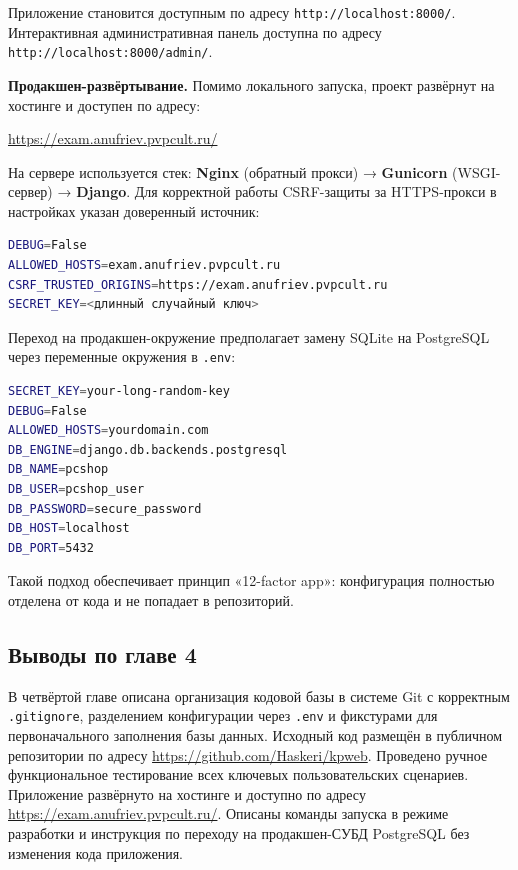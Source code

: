 \documentclass[14pt, a4paper]{extarticle}
\begin{document}
Приложение становится доступным по адресу \texttt{http://localhost:8000/}. Интерактивная административная панель доступна по адресу \texttt{http://localhost:8000/admin/}.

\textbf{Продакшен-развёртывание.} Помимо локального запуска, проект развёрнут на хостинге и доступен по адресу:

\begin{center}
\url{https://exam.anufriev.pvpcult.ru/}
\end{center}

На сервере используется стек: \textbf{Nginx} (обратный прокси) → \textbf{Gunicorn} (WSGI-сервер) → \textbf{Django}. Для корректной работы CSRF-защиты за HTTPS-прокси в настройках указан доверенный источник:

\begin{lstlisting}[language=bash, caption={Ключевые параметры .env на сервере}]
DEBUG=False
ALLOWED_HOSTS=exam.anufriev.pvpcult.ru
CSRF_TRUSTED_ORIGINS=https://exam.anufriev.pvpcult.ru
SECRET_KEY=<длинный случайный ключ>
\end{lstlisting}

Переход на продакшен-окружение предполагает замену SQLite на PostgreSQL через переменные окружения в \texttt{.env}:

\begin{lstlisting}[language=bash, caption={Пример файла .env для PostgreSQL}]
SECRET_KEY=your-long-random-key
DEBUG=False
ALLOWED_HOSTS=yourdomain.com
DB_ENGINE=django.db.backends.postgresql
DB_NAME=pcshop
DB_USER=pcshop_user
DB_PASSWORD=secure_password
DB_HOST=localhost
DB_PORT=5432
\end{lstlisting}

Такой подход обеспечивает принцип «12-factor app»: конфигурация полностью отделена от кода и не попадает в репозиторий.

\subsection*{Выводы по главе 4}

В четвёртой главе описана организация кодовой базы в системе Git с корректным \texttt{.gitignore}, разделением конфигурации через \texttt{.env} и фикстурами для первоначального заполнения базы данных. Исходный код размещён в публичном репозитории по адресу \url{https://github.com/Haskeri/kpweb}. Проведено ручное функциональное тестирование всех ключевых пользовательских сценариев. Приложение развёрнуто на хостинге и доступно по адресу \url{https://exam.anufriev.pvpcult.ru/}. Описаны команды запуска в режиме разработки и инструкция по переходу на продакшен-СУБД PostgreSQL без изменения кода приложения.
\end{document}
